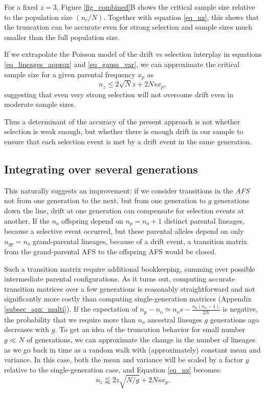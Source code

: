 \documentclass[9pt,twocolumn,twoside,lineno]{gsajnl}
\begin{document}
 For a fixed $z=3$, Figure \ref{fig_combined}B shows the critical sample size relative to the population size
 $(n_c/N)$. Together with equation \ref{eq_nz}, this shows
that the truncation can be accurate even for strong selection and sample sizes much smaller than
the full population size.

If we extrapolate the Poisson model of the drift vs selection interplay in equations \eqref{eq_lineages_approx} and \eqref{eq_gauss_var},
we can approximate the critical sample size for a given parental frequency $x_p$ as
\begin{equation*}
  n_z \leq 2 \sqrt{N} z + 2Nsx_p,
\end{equation*}
suggesting that even very strong selection will not overcome drift even in moderate sample sizes. 

Thus a determinant of the accuracy of the present approach is not whether selection
is weak enough, but whether there is enough drift in our sample to ensure that each 
selection event is met by a drift event in the same generation. 

\subsection{Integrating over several generations}
This naturally suggests an improvement: if we consider transitions in the 
\textit{AFS}  not from one generation to the next, but from one generation to $g$ generations down the line, drift at one generation can compensate for selection events at another.  If the $n_o$ offspring depend on $n_p=n_o+1$ distinct parental lineages, because a selective event occurred, but these parental alleles depend on only $n_{gp} = n_o$ grand-parental lineages, because of a drift event, a transition matrix from the grand-parental AFS to the offspring AFS would be closed.   

Such a transition matrix require additional bookkeeping, summing over possible intermediate parental configurations. As it turns out, computing accurate transition matrices over a few generations is reasonably straightforward and not significantly more costly than computing single-generation matrices
(Appendix \ref{subsec_apx_multi}). If the expectation of $n_p-n_o \simeq n_o  s - \frac{n_o (n_o-1) }{2N}$ is negative, the probability that we require more than $n_o$ ancestral lineages $g$ generations ago decreases with $g.$
To get an idea of the truncation behavior
for small number $g \ll N$ of generations, we can approximate the change  in the number
of lineages as we go back in time as a random walk with (approximately) constant mean and
variance. In this case, both the mean and variance will be scaled by a factor $g$ relative
to the single-generation case, and Equation \eqref{eq_nz} becomes:
\begin{equation}
  n_z \lessapprox 2 z\sqrt{N/g} + 2N s x_p.
\label{eq_nzg}
\end{equation}
\end{document}
